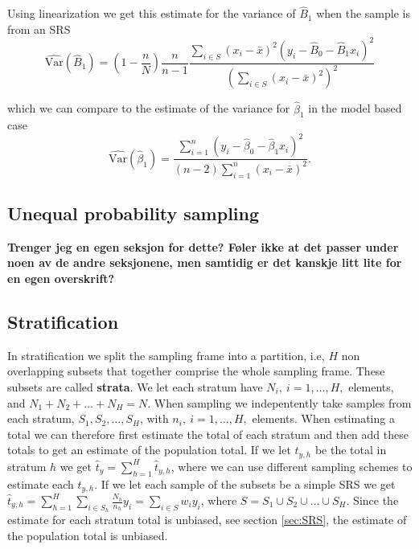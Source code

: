 \documentclass{article}
\begin{document}
Using linearization we get this estimate for the variance of \(\hat{B}_1\) when
the sample is from an SRS\begin{equation*}
\widehat{\mathrm{Var}}(\hat{B}_1) = \left( 1 - \frac{n}{N} \right) \frac{n}{n - 1} \frac{\sum_{i \in S} \left( x_i - \bar{x} \right)^2 \left( y_i - \hat{B}_0 - \hat{B}_1 x_i \right)^2}
{\left( \sum_{i \in S} \left( x_i - \bar{x} \right)^2 \right)^2}
\end{equation*}

which we can compare to the estimate of the variance for \(\hat{\beta}_1\) in
the model based case
\begin{equation*}
 \widehat{\mathrm{Var}} \left( \hat{\beta}_1 \right) = \frac{\sum_{i = 1}^n\left( y_i - \hat{\beta}_0 -
 \hat{\beta}_1 x_i \right)^2}{
   \left( n - 2 \right)\sum_{i = 1}^n \left( x_i - \bar{x} \right)^2}.
\end{equation*}

\subsection{Unequal probability sampling}
\textbf{Trenger jeg en egen seksjon for dette? Føler ikke at det passer under
  noen av de andre seksjonene, men samtidig er det kanskje litt lite for en egen
overskrift?}

\subsection{Stratification} \label{sec:strat}

In stratification we split the sampling frame into a partition, i.e, \(H\) non
overlapping subsets that together comprise the whole sampling frame. These
subsets are called \textbf{strata}. We let each stratum have \(N_i,\ i = 1, \dots
, H,\) elements, and \(N_1 + N_2 + \dots + N_H = N\). When sampling we
indepentently take samples from each stratum, \(S_1, S_2, \dots, S_H\), with \(n_i,\ i = 1, \dots
, H,\) elements. When
estimating a total we can therefore first estimate the total of each stratum and
then add these totals to get an estimate of the population total.
If we let \(t_{y,h}\) be the total in stratum \(h\) we get \(\hat{t}_y =
\sum_{h = 1}^H \hat{t}_{y, h} \), where we can use different sampling schemes to
estimate each \(t_{y, h}\).
If we let each sample of the subsets be a simple SRS we get \( \hat{t}_{y, h} =
\sum_{h = 1}^H\sum_{i \in S_h}\frac{N_h}{n_h}y_i = \sum_{i \in S} w_i y_i\),
where \(S = S_1 \cup S_2 \cup \dots \cup S_H\).
Since the estimate for each
stratum total is unbiased, see section \ref{sec:SRS}, the estimate of the population
total is unbiased.
\end{document}
